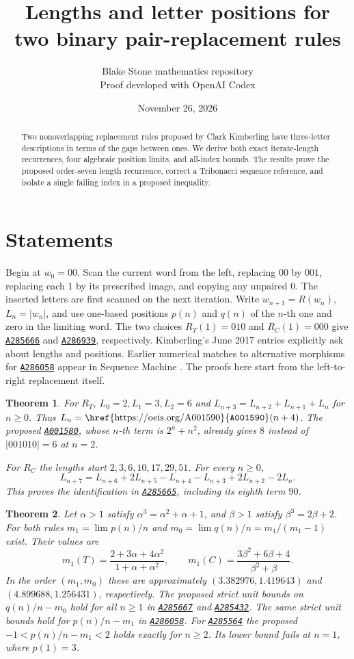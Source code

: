 \documentclass[10pt]{article}
\title{\vspace{-1.2em}Lengths and letter positions for two binary pair-replacement rules}
\author{Blake Stone mathematics repository\\[-2pt]\small Proof developed with OpenAI Codex}
\date{November 26, 2026}
\newtheorem{theorem}{Theorem}
\newcommand{\oeisentry}[1]{\href{https://oeis.org/#1}{\texttt{#1}}}
\begin{document}
\maketitle
\begin{abstract}
Two nonoverlapping replacement rules proposed by Clark Kimberling have three-letter
descriptions in terms of the gaps between ones. We derive both exact iterate-length
recurrences, four algebraic position limits, and all-index bounds. The results prove
the proposed order-seven length recurrence, correct a Tribonacci sequence reference,
and isolate a single failing index in a proposed inequality.
\end{abstract}

\section{Statements}
Begin at $w_0=00$. Scan the current word from the left, replacing $00$ by $001$, replacing
each $1$ by its prescribed image, and copying any unpaired $0$. The inserted letters are first
scanned on the next iteration. Write $w_{n+1}=R(w_n)$, $L_n=|w_n|$, and use one-based
positions $p(n)$ and $q(n)$ of the $n$-th one and zero in the limiting word.
The two choices $R_T(1)=010$ and $R_C(1)=000$ give \oeisentry{A285666} and \oeisentry{A286939},
respectively. Kimberling's June 2017 entries explicitly ask about lengths and positions.
Earlier numerical matches to alternative morphisms for \oeisentry{A286058} appear in Sequence
Machine \cite{sm}. The proofs here start from the left-to-right replacement itself.

\begin{theorem}\label{th:length}
For $R_T$, $L_0=2,L_1=3,L_2=6$ and $L_{n+3}=L_{n+2}+L_{n+1}+L_n$ for $n\ge0$.
Thus $L_n=\text{\oeisentry{A001590}}(n+4)$. The proposed \oeisentry{A001580}, whose $n$-th term is
$2^n+n^2$, already gives $8$ instead of $|001010|=6$ at $n=2$.

For $R_C$ the lengths start $2,3,6,10,17,29,51$. For every $n\ge0$,
\[
 L_{n+7}=L_{n+6}+2L_{n+5}-L_{n+4}-L_{n+3}+2L_{n+2}-2L_n.
\]
This proves the identification in \oeisentry{A285665}, including its eighth term $90$.
\end{theorem}

\begin{theorem}\label{th:dens}
Let $\alpha>1$ satisfy $\alpha^3=\alpha^2+\alpha+1$, and $\beta>1$ satisfy
$\beta^3=2\beta+2$. For both rules $m_1=\lim p(n)/n$ and $m_0=\lim q(n)/n=m_1/(m_1-1)$
exist. Their values are
\[
 m_1(T)=\frac{2+3\alpha+4\alpha^2}{1+\alpha+\alpha^2},\qquad
 m_1(C)=\frac{3\beta^2+6\beta+4}{\beta^2+\beta}.
\]
In the order $(m_1,m_0)$ these are approximately $(3.382976,1.419643)$ and
$(4.899688,1.256431)$, respectively. The proposed strict unit bounds on
$q(n)/n-m_0$ hold for all $n\ge1$ in \oeisentry{A285667} and \oeisentry{A285432}. The same strict
unit bounds hold for $p(n)/n-m_1$ in \oeisentry{A286058}. For \oeisentry{A285564} the proposed
$-1<p(n)/n-m_1<2$ holds exactly for $n\ge2$. Its lower bound fails at $n=1$, where
$p(1)=3$.
\end{theorem}
\end{document}
